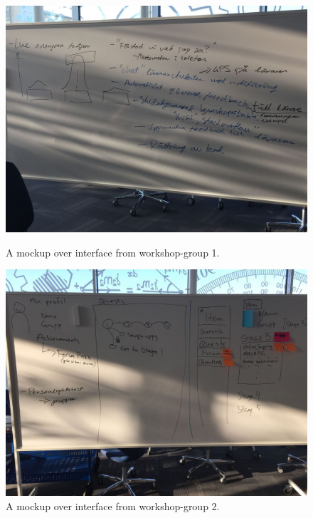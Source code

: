 \documentclass[a4paper,12pt]{article}
\begin{document}
\begin{figure}[H]
  \centering
  \begin{minipage}[b]{0.7\textwidth}
    \includegraphics[width=\textwidth]{img/Grupp1_Workshop_mockup.jpg}
    \caption{A mockup over interface from workshop-group 1.}
  \end{minipage}
  \hfill
  \begin{minipage}[b]{0.7\textwidth}
      \includegraphics[width=\textwidth]{img/Grupp2_Workshop_mockup.jpg}
    \caption{A mockup over interface from workshop-group 2.}
  \end{minipage}
\end{figure}
\end{document}
